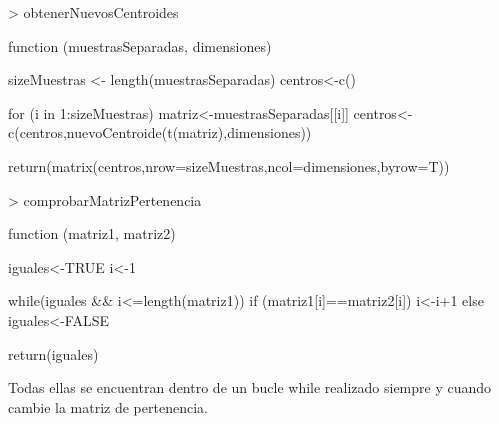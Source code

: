 \documentclass [a4paper] {article}
\begin{document}
\begin{Schunk}
\begin{Sinput}
> obtenerNuevosCentroides
\end{Sinput}
\begin{Soutput}
function (muestrasSeparadas, dimensiones) {
    sizeMuestras <- length(muestrasSeparadas)
    centros<-c()

    for (i in 1:sizeMuestras){
        matriz<-muestrasSeparadas[[i]]
        centros<-c(centros,nuevoCentroide(t(matriz),dimensiones))
    }

    return(matrix(centros,nrow=sizeMuestras,ncol=dimensiones,byrow=T))
}
\end{Soutput}
\begin{Sinput}
> comprobarMatrizPertenencia
\end{Sinput}
\begin{Soutput}
function (matriz1, matriz2) {
    iguales<-TRUE
    i<-1

    while(iguales && i<=length(matriz1)){
        if (matriz1[i]==matriz2[i]){
            i<-i+1
        } else {
            iguales<-FALSE
        }
    }

    return(iguales)
}
\end{Soutput}
\end{Schunk}

\bigskip
Todas ellas se encuentran dentro de un bucle while realizado siempre y cuando cambie la matriz de pertenencia.
\end{document}
